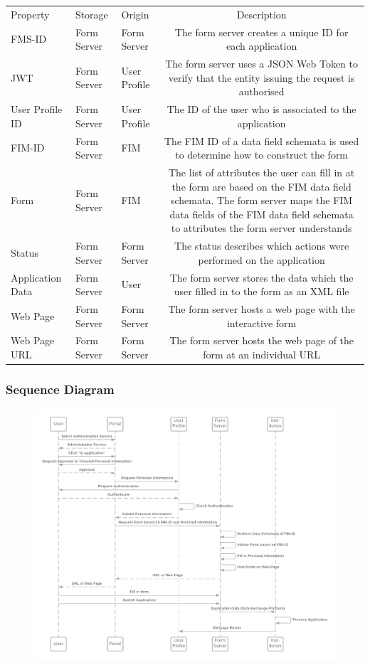 \begin{table}[!h]
    \begin{tabularx}{\textwidth}{|l|l|l|C|}
    \hline
     \\
    \hline
    Property & Storage & Origin & Description  \\
    \hline
    \hline
    FMS-ID & Form Server & Form Server & The form server creates a unique ID for each application \\
    \hline
    JWT & Form Server & User Profile & The form server uses a JSON Web Token to verify that the entity issuing the request is authorised \\
    \hline
    User Profile ID & Form Server & User Profile & The ID of the user who is associated to the application \\
    \hline
    FIM-ID & Form Server & FIM & The FIM ID of a data field schemata is used to determine how to construct the form \\
    \hline
    Form & Form Server & FIM & The list of attributes the user can fill in at the form are based on the FIM data field schemata. The form server maps the FIM data fields of the FIM data field schemata to attributes the form server understands \\
    \hline
    Status & Form Server & Form Server & The status describes which actions were performed on the application \\
    \hline
    Application Data & Form Server & User & The form server stores the data which the user filled in to the form as an XML file \\
    \hline
    Web Page & Form Server & Form Server & The form server hosts a web page with the interactive form  \\
    \hline 
    Web Page URL & Form Server & Form Server & The form server hosts the web page of the form at an individual URL \\
    \hline 
    \end{tabularx}
\end{table}

\subsubsection{Sequence Diagram}

\begin{figure}[!h]
    \centering
    \includegraphics[width=17cm]{Diagrams/Basic Use Case Sequence Diagram.png}
\end{figure}
